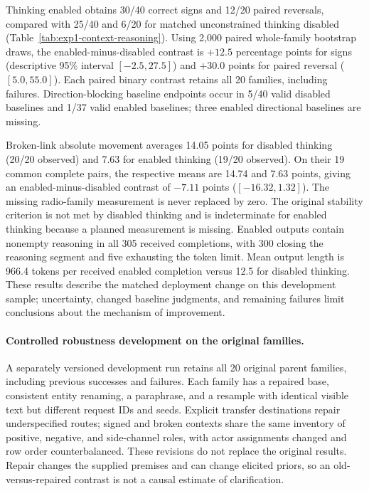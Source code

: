 Thinking enabled obtains 30/40 correct signs and 12/20 paired reversals, compared
with 25/40 and 6/20 for matched unconstrained thinking disabled
(Table~\ref{tab:exp1-context-reasoning}). Using 2,000 paired whole-family
bootstrap draws, the enabled-minus-disabled contrast is $+12.5$ percentage
points for signs (descriptive 95\% interval $[-2.5,27.5]$) and $+30.0$ points
for paired reversal ($[5.0,55.0]$). Each paired binary contrast retains all
20 families, including failures. Direction-blocking baseline endpoints occur
in 5/40 valid disabled baselines and 1/37 valid enabled baselines; three enabled
directional baselines are missing.

Broken-link absolute movement averages 14.05 points for disabled thinking
(20/20 observed) and 7.63 for enabled thinking (19/20 observed). On their
19 common complete pairs, the respective means are 14.74 and 7.63 points,
giving an enabled-minus-disabled contrast of $-7.11$ points
($[-16.32,1.32]$). The missing radio-family measurement is never replaced
by zero. The original stability criterion is not met by disabled thinking
and is indeterminate for enabled thinking because a planned measurement is
missing. Enabled outputs contain nonempty reasoning in all 305 received
completions, with 300 closing the reasoning segment and five exhausting the
token limit. Mean output length is 966.4 tokens per received enabled completion
versus 12.5 for disabled thinking. These results describe the matched deployment
change on this development sample; uncertainty, changed baseline judgments,
and remaining failures limit conclusions about the mechanism of improvement.

\paragraph{Controlled robustness development on the original families.}
A separately versioned development run retains all 20 original parent families,
including previous successes and failures. Each family has a repaired base,
consistent entity renaming, a paraphrase, and a resample with identical visible
text but different request IDs and seeds. Explicit transfer destinations repair
underspecified routes; signed and broken contexts share the same inventory of
positive, negative, and side-channel roles, with actor assignments changed and
row order counterbalanced. These revisions do not replace the original results.
Repair changes the supplied premises and can change elicited priors, so an
old-versus-repaired contrast is not a causal estimate of clarification.

